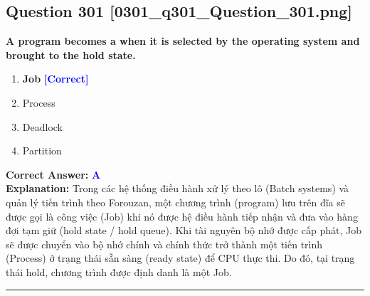 \documentclass[11pt,a4paper]{article}
\begin{document}
\begin{minipage}{\textwidth}
\subsection*{Question 301 \quad \footnotesize{[0301\_q301\_Question\_301.png]}}
\noindent \textbf{A program becomes a when it is selected by the operating system and brought to the hold state.}

\begin{enumerate}[label=\Alph*.]
    \item \textbf{Job} \hfill \textcolor{blue}{\textbf{[Correct]}}
    \item Process
    \item Deadlock
    \item Partition
\end{enumerate}

\noindent \textbf{Correct Answer:} \textcolor{blue}{\textbf{A}} \\[2pt]
\noindent \textbf{Explanation:} Trong các hệ thống điều hành xử lý theo lô (Batch systems) và quản lý tiến trình theo Forouzan, một chương trình (program) lưu trên đĩa sẽ được gọi là công việc (Job) khi nó được hệ điều hành tiếp nhận và đưa vào hàng đợi tạm giữ (hold state / hold queue). Khi tài nguyên bộ nhớ được cấp phát, Job sẽ được chuyển vào bộ nhớ chính và chính thức trở thành một tiến trình (Process) ở trạng thái sẵn sàng (ready state) để CPU thực thi. Do đó, tại trạng thái hold, chương trình được định danh là một Job.

\par\vspace{0.3cm}
\hrule
\vspace{0.3cm}
\end{minipage}
\end{document}
